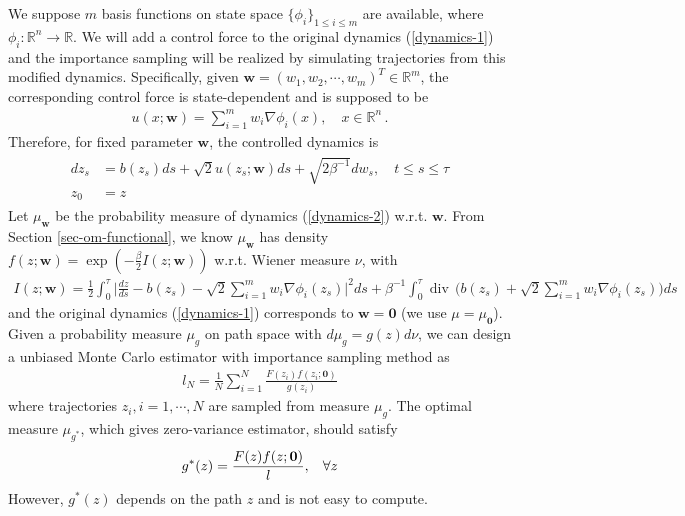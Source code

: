 \documentclass[final]{siamltex}
\begin{document}
We suppose $m$ basis functions on state space $\{\phi_i\}_{1\le i \le m}$ are
available, where $\phi_i : \mathbb{R}^n\rightarrow \mathbb{R}$. 
We will add a control force to the original dynamics (\ref{dynamics-1})
and the importance sampling will be realized by simulating trajectories from
this modified dynamics. Specifically, given $\bm{w} = (w_1, w_2,
\cdots, w_m)^T \in \mathbb{R}^m$,
the corresponding control force is state-dependent and is supposed to be 
\begin{align}
  u(x; \bm{w}) = \sum\limits_{i = 1}^{m} w_i \nabla \phi_i(x), \quad x \in
  \mathbb{R}^n\,.
  \label{control-force}
\end{align}
Therefore, for fixed parameter $\bm{w}$, the controlled dynamics is 
\begin{align}
\begin{split}
  d z_s &= b(z_s) ds + \sqrt{2}u(z_s;\bm{w}) ds + \sqrt{2\beta^{-1}} dw_s, \quad t \le s \le \tau \\
     z_0 &=z
  \end{split}
\label{dynamics-2}
\end{align}
Let $\mu_{\bm{w}}$ be the probability measure of dynamics (\ref{dynamics-2})
w.r.t. $\bm{w}$. 
From Section \ref{sec-om-functional},  we know $\mu_{\bm{w}}$ has density 
$f(z;\bm{w}) = \exp(-\frac{\beta}{2} I(z ; \bm{w}))$ w.r.t. Wiener
measure $\nu$, with
\begin{align}
  I(z ; \bm{w}) = \frac{1}{2}\int_0^\tau \Big|\frac{dz}{ds}- b(z_s) -
  \sqrt{2}\sum\limits_{i = 1}^{m} w_i \nabla \phi_i(z_s)\Big|^2 ds + \beta^{-1}
  \int_0^\tau \operatorname{div}\, \Big(b(z_s) + \sqrt{2}\sum\limits_{i =
  1}^{m} w_i \nabla \phi_i(z_s)\Big) ds
  \label{om-fun-w}
\end{align}
and the original dynamics (\ref{dynamics-1}) corresponds to $\bm{w} = \bm{0}$ (we use $\mu = \mu_{\bm{0}}$).
Given a probability measure $\mu_g$ on path space with $d\mu_g = g(z)d\nu$, 
we can design a unbiased Monte Carlo estimator with importance sampling method as 
\begin{align}
  l_N = \frac{1}{N} \sum_{i=1}^{N}  \frac{F(z_i)f(z_i;\bm{0})}{g(z_i)}
\end{align}
where trajectories $z_i, i = 1, \cdots, N$ are sampled from measure $\mu_g$.
The optimal measure $\mu_{g^*}$, which gives
zero-variance estimator, should satisfy 
\begin{align}
  g^*(z) = \frac{F(z)f(z;\bm{0})}{l}, \hspace{3mm} \forall z
  \label{optimal_pdf}
\end{align}
However, $g^*(z)$ depends on the path $z$ and is not easy to compute. 
\end{document}
